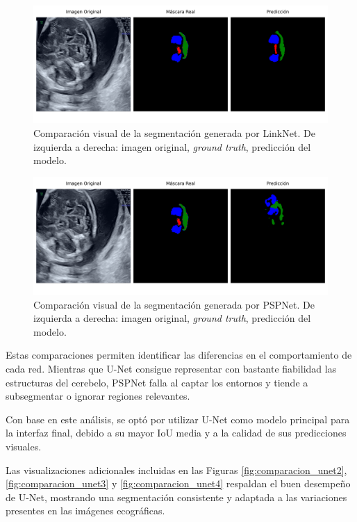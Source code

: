 \begin{figure}[h]
    \centering
    \includegraphics[width=1\textwidth]{img/image1_linknet.png}
    \caption{Comparación visual de la segmentación generada por LinkNet. De izquierda a derecha: imagen original, \textit{ground truth}, predicción del modelo.}
    \label{fig:comparacion_linknet}
\end{figure}

\begin{figure}[h]
    \centering
    \includegraphics[width=1\textwidth]{img/image1_pspnet.png}
    \caption{Comparación visual de la segmentación generada por PSPNet. De izquierda a derecha: imagen original, \textit{ground truth}, predicción del modelo.}
    \label{fig:comparacion_pspnet}
\end{figure}

Estas comparaciones permiten identificar las diferencias en el comportamiento de cada red. Mientras que U-Net consigue representar con bastante fiabilidad las estructuras del cerebelo, PSPNet falla al captar los entornos y tiende a subsegmentar o ignorar regiones relevantes.

Con base en este análisis, se optó por utilizar U-Net como modelo principal para la interfaz final, debido a su mayor IoU media y a la calidad de sus predicciones visuales.

Las visualizaciones adicionales incluidas en las Figuras \ref{fig:comparacion_unet2}, \ref{fig:comparacion_unet3} y \ref{fig:comparacion_unet4} respaldan el buen desempeño de U-Net, mostrando una segmentación consistente y adaptada a las variaciones presentes en las imágenes ecográficas.

